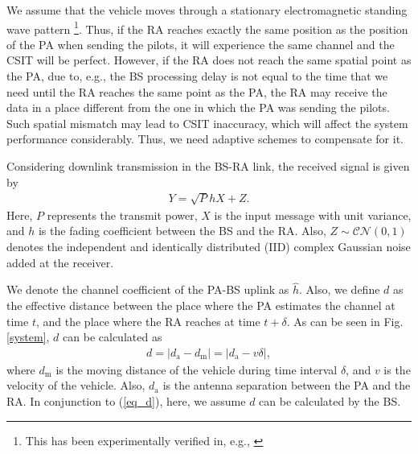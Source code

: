 We assume that the vehicle moves through a stationary electromagnetic standing wave pattern \footnote{This has been experimentally verified in, e.g., \cite{Jamaly2014EuCAPanalysis}}. Thus, if the RA reaches exactly the same position as the position of the PA when sending the pilots, it will experience the same channel and the CSIT will be perfect. However, if the RA does not reach the same spatial point as the PA, due to, e.g., the BS processing delay is not equal to the time that we need until the RA reaches the same point as the PA, the RA may receive the data in a place different from the one in which the PA was sending the pilots. Such spatial mismatch may lead to CSIT inaccuracy, which will affect the system performance considerably. Thus, we need adaptive schemes to compensate for it.

Considering downlink transmission in the BS-RA link, the received signal is given by
\begin{align}\label{eq_Y}
{{Y}} = \sqrt{P}hX + Z.
\end{align}
Here, $P$ represents the transmit power, $X$ is the input message with unit variance, and $h$ is the fading coefficient between the BS and the RA. Also, $Z \sim \mathcal{CN}(0,1)$ denotes the independent and identically distributed (IID) complex Gaussian noise added at the receiver.



We denote the channel coefficient of the PA-BS uplink as $\hat{h}$. Also, we define $d$ as the effective distance between  the place where the PA estimates the channel at time $t$, and the place where the RA reaches at time $t+\delta$. As can be seen in Fig. \ref{system}, $d$ can be calculated as
\begin{align}\label{eq_d}
    d = |d_\text{a} - d_\text{m} | = |d_\text{a} - v\delta|,
\end{align}
where $d_\text{m}$ is the moving distance of the vehicle during time interval $\delta$, and $v$ is the velocity of the vehicle. Also, $d_\text{a}$ is the antenna separation between the PA and the RA. In conjunction to (\ref{eq_d}), here, we assume $d$ can be calculated by the BS. 

